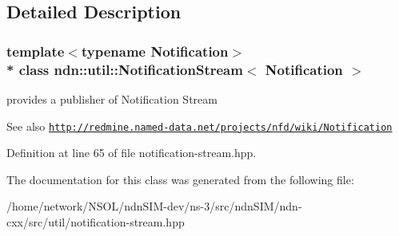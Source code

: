 \subsection{Detailed Description}
\subsubsection*{template$<$typename Notification$>$\\*
class ndn\+::util\+::\+Notification\+Stream$<$ Notification $>$}

provides a publisher of Notification Stream 

\begin{DoxySeeAlso}{See also}
\href{http://redmine.named-data.net/projects/nfd/wiki/Notification}{\tt http\+://redmine.\+named-\/data.\+net/projects/nfd/wiki/\+Notification} 
\end{DoxySeeAlso}


Definition at line 65 of file notification-\/stream.\+hpp.



The documentation for this class was generated from the following file\+:\begin{DoxyCompactItemize}
\item 
/home/network/\+N\+S\+O\+L/ndn\+S\+I\+M-\/dev/ns-\/3/src/ndn\+S\+I\+M/ndn-\/cxx/src/util/notification-\/stream.\+hpp\end{DoxyCompactItemize}
